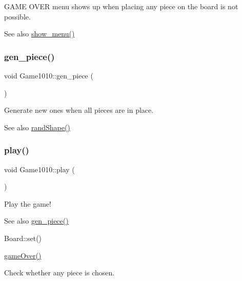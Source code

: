 G\+A\+ME O\+V\+ER menu shows up when placing any piece on the board is not possible. 

\begin{DoxySeeAlso}{See also}
\mbox{\hyperlink{class_game1010_a99d6f53c3073861fe37ef67caa073840}{show\+\_\+menu()}} 
\end{DoxySeeAlso}
\mbox{\label{class_game1010_a9576170947a355682c922cb648432b9e}} 
\subsubsection{\texorpdfstring{gen\+\_\+piece()}{gen\_piece()}}
{\footnotesize\ttfamily void Game1010\+::gen\+\_\+piece (\begin{DoxyParamCaption}{ }\end{DoxyParamCaption})\hspace{0.3cm}{\ttfamily [inline]}}



Generate new ones when all pieces are in place. 

\begin{DoxySeeAlso}{See also}
\mbox{\hyperlink{class_game1010_a9b86f7bf4ad3af111014ad33a781ffe5}{rand\+Shape()}} 
\end{DoxySeeAlso}
\mbox{\label{class_game1010_afa18a3a81b8966417a228459a5bebf53}} 
\subsubsection{\texorpdfstring{play()}{play()}}
{\footnotesize\ttfamily void Game1010\+::play (\begin{DoxyParamCaption}{ }\end{DoxyParamCaption})\hspace{0.3cm}{\ttfamily [inline]}}



Play the game! 

\begin{DoxySeeAlso}{See also}
\mbox{\hyperlink{class_game1010_a9576170947a355682c922cb648432b9e}{gen\+\_\+piece()}} 

Board\+::set() 

\mbox{\hyperlink{class_game1010_a3bc296b7ba6bffeda3baceb1240190b6}{game\+Over()}} 
\end{DoxySeeAlso}
Check whether any piece is chosen.

